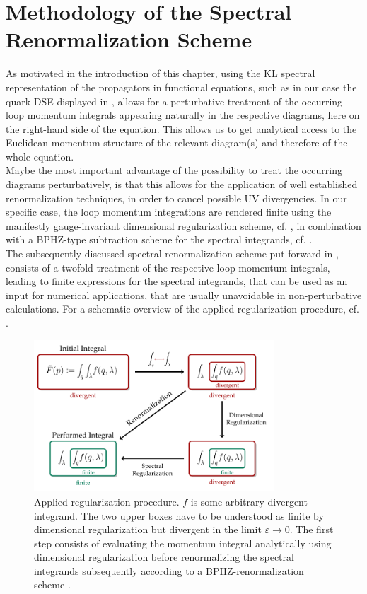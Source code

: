 \section{Methodology of the Spectral Renormalization Scheme}
As motivated in the introduction of this chapter, using the KL spectral representation of the propagators in functional equations, such as in our case the quark DSE displayed in , allows for a perturbative treatment of the occurring loop momentum integrals appearing naturally in the respective  diagrams, here on the right-hand side of the equation. This allows us to get analytical access to the Euclidean momentum structure of the relevant diagram(s) and therefore of the whole equation. \\
Maybe the most important advantage of the possibility to treat the occurring diagrams perturbatively, is that this allows for the application of well established  renormalization techniques, in order to cancel possible UV divergencies. In our specific case, the loop momentum integrations are rendered finite using the manifestly gauge-invariant dimensional regularization scheme, cf. \cite{Leibbrandt1975, PeskinSchroeder1995}, in combination with a BPHZ-type subtraction scheme for the spectral integrands, cf.  \cite{BogolyubovParasiuk1954,Hepp1966,Zimmermann1969}.\\
 The subsequently discussed spectral renormalization scheme put forward in  \cite{Horak2019,Wink2020,HorakPawlowskiWink2020}, consists of a twofold treatment of the respective loop momentum integrals, leading to finite expressions for the spectral integrands, that can be used as an input for numerical applications, that are usually unavoidable in non-perturbative calculations.  For a schematic  overview of the applied regularization procedure, cf. .\\
 \begin{figure}[t]
\centering
\includegraphics[width=0.8\textwidth]{figs/tikz/spectral_renormalization}
\caption[Applied regularization procedure.]{Applied regularization procedure. $f$ is some arbitrary divergent integrand. The two upper boxes have to be understood as finite by dimensional regularization but divergent in the limit $\varepsilon\rightarrow 0$. The first step consists of evaluating the momentum integral analytically using dimensional regularization \cite{Leibbrandt1975} before renormalizing the spectral integrands subsequently according to a BPHZ-renormalization scheme \cite{BogolyubovParasiuk1954, Hepp1966, Zimmermann1969}.}\label{fig:spectral_renormalization}
\end{figure}
